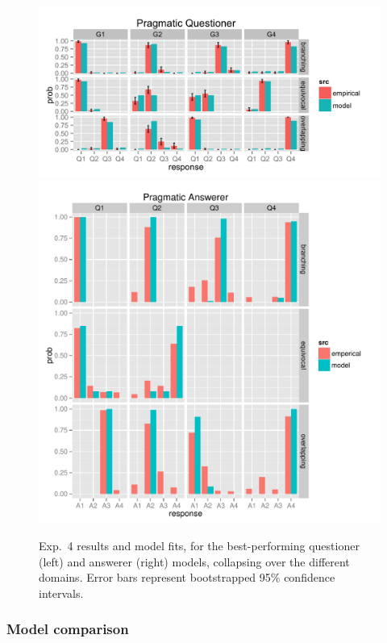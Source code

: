 \documentclass[12pt, floatsintext, man]{apa6}
\begin{document}
\begin{figure}[t!]
\begin{center}
\includegraphics[scale = .25]{Exp4QuestResults}
\includegraphics[scale = .25]{Exp4AnsResults}
\end{center}
\vspace{-.5cm}
\caption{Exp.~4 results and model fits, for the best-performing questioner (left) and answerer (right) models, collapsing over the different domains. Error bars represent bootstrapped 95\% confidence intervals.}
\vspace{-.1cm}
\label{fig:exp4res}
\end{figure}

\subsubsection{Model comparison}
\end{document}
